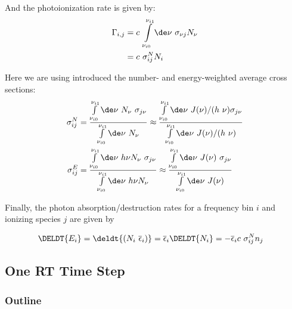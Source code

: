 And the photoionization rate is given by:
\begin{align}
\Gamma_{i, j}
	&=
		c \ \int\limits_{\nu_{i0}}^{\nu_{i1}}\de \nu \ \sigma_{\nu j} N_\nu \\
	&= c \ \sigma_{ij}^N N_i
\end{align}

Here we are using introduced the number- and energy-weighted average cross sections:
\begin{align}
\sigma_{ij}^N &=
		\frac{
			\int\limits_{\nu_{i0}}^{\nu_{i1}}\de \nu \ N_\nu \ \sigma_{j\nu}
		} {
		  \int\limits_{\nu_{i0}}^{\nu_{i1}}\de \nu \ N_\nu
		}
		\approx
		\frac{
			\int\limits_{\nu_{i0}}^{\nu_{i1}}\de \nu \ J(\nu) / (h \ \nu) \sigma_{j\nu}
		} {
  		\int\limits_{\nu_{i0}}^{\nu_{i1}}\de \nu \ J(\nu) / (h \ \nu)
		} \label{eq:sigma_N}\\
\sigma_{ij}^E &=
		\frac{
			\int\limits_{\nu_{i0}}^{\nu_{i1}}\de \nu \ h \nu N_\nu \ \sigma_{j\nu}
		}	{
			\int\limits_{\nu_{i0}}^{\nu_{i1}}\de \nu \ h \nu N_\nu
		}
		\approx
		\frac{
			\int\limits_{\nu_{i0}}^{\nu_{i1}}\de \nu \ J(\nu) \  \sigma_{j\nu}
		}	{
			\int\limits_{\nu_{i0}}^{\nu_{i1}}\de \nu \ J(\nu)
		} \label{eq:sigma_E}
\end{align}




Finally, the photon absorption/destruction rates for a frequency bin $i$ and ionizing species $j$ 
are given by

\begin{align}
\DELDT{E_i} &= 
    \deldt{(N_i \ \overline{\epsilon}_i)} = 
    \overline{\epsilon}_i \DELDT{N_i} =  
    -\overline{\epsilon}_i c \ \sigma_{i j} ^ N n_j
\end{align}







\subsection{One RT Time Step}



\subsubsection{Outline}


